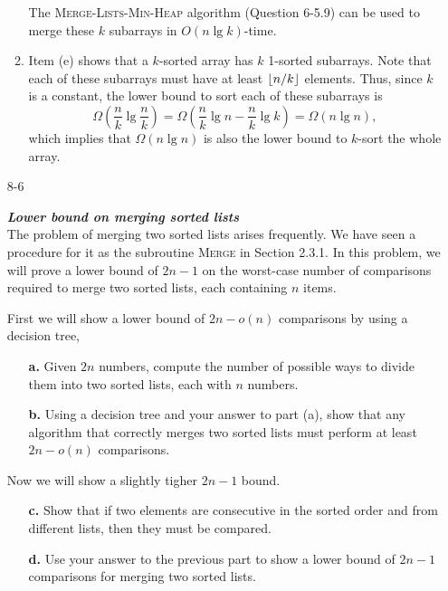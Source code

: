 \begin{enumerate}
\begin{framed}
\begin{enumerate}
The \textsc{Merge-Lists-Min-Heap} algorithm (Question 6-5.9) can be used to
merge these $k$ subarrays in $O(n \lg k)$-time.

\item Item (e) shows that a $k$-sorted array has $k$ 1-sorted subarrays.  Note
that each of these subarrays must have at least $\lfloor n / k\rfloor$ elements. Thus,
since $k$ is a constant, the lower bound to sort each of these subarrays is
\[
  \Omega\left(\frac{n}{k} \lg \frac{n}{k}\right) = \Omega\left(\frac{n}{k} \lg n - \frac{n}{k} \lg k\right) = \Omega(n \lg n),
\]
which implies that $\Omega(n \lg n)$ is also the lower bound to $k$-sort the
whole array.
\end{enumerate}
\end{framed}

\newpage

\item[8-6]{\textbf{\emph{Lower bound on merging sorted lists}}\\
The problem of merging two sorted lists arises frequently. We have seen
a procedure for it as the subroutine \textsc{Merge} in Section 2.3.1. In this
problem, we will prove a lower bound of $2n - 1$ on the worst-case number of
comparisons required to merge two sorted lists, each containing $n$ items.

First we will show a lower bound of $2n - o(n)$ comparisons by using a decision
tree,

\begin{enumerate}
\item[\textbf{a.}]{Given $2n$ numbers, compute the number of possible ways to
  divide them into two sorted lists, each with $n$ numbers.}
\item[\textbf{b.}]{Using a decision tree and your answer to part (a), show that
any algorithm that correctly merges two sorted lists must perform at least
$2n - o(n)$ comparisons.}
\end{enumerate}

Now we will show a slightly tigher $2n - 1$ bound.

\begin{enumerate}
\item[\textbf{c.}]{Show that if two elements are consecutive in the sorted order
and from different lists, then they must be compared.}
\item[\textbf{d.}]{Use your answer to the previous part to show a lower bound of
$2n - 1$ comparisons for merging two sorted lists.}
\end{enumerate}
}


\end{enumerate}
